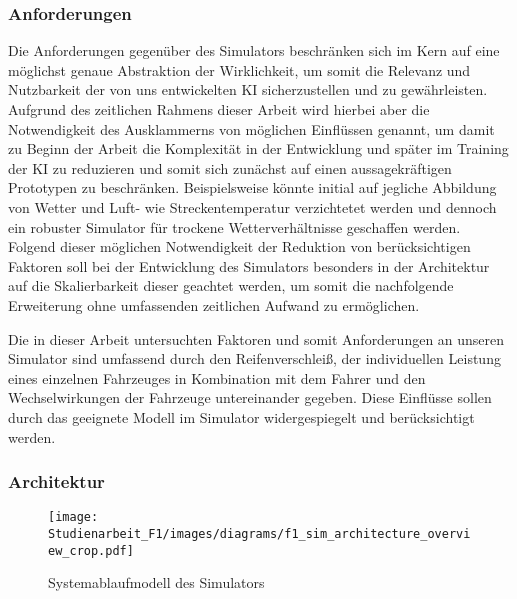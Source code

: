 \subsubsection{Anforderungen}
Die Anforderungen gegenüber des Simulators beschränken sich im Kern auf eine möglichst genaue Abstraktion der Wirklichkeit, um somit die Relevanz und Nutzbarkeit der von uns entwickelten KI sicherzustellen und zu gewährleisten. Aufgrund des zeitlichen Rahmens dieser Arbeit wird hierbei aber die Notwendigkeit des Ausklammerns von möglichen Einflüssen genannt, um damit zu Beginn der Arbeit die Komplexität in der Entwicklung und später im Training der KI zu reduzieren und somit sich zunächst auf einen aussagekräftigen Prototypen zu beschränken. Beispielsweise könnte initial auf jegliche Abbildung von Wetter und Luft- wie Streckentemperatur verzichtetet werden und dennoch ein robuster Simulator für trockene Wetterverhältnisse geschaffen werden. Folgend dieser möglichen Notwendigkeit der Reduktion von berücksichtigen Faktoren soll bei der Entwicklung des Simulators besonders in der Architektur auf die Skalierbarkeit dieser geachtet werden, um somit die nachfolgende Erweiterung ohne umfassenden zeitlichen Aufwand zu ermöglichen.

Die in dieser Arbeit untersuchten Faktoren und somit Anforderungen an unseren Simulator sind umfassend durch den Reifenverschleiß, der individuellen Leistung eines einzelnen Fahrzeuges in Kombination mit dem Fahrer und den Wechselwirkungen der Fahrzeuge untereinander gegeben. Diese Einflüsse sollen durch das geeignete Modell im Simulator widergespiegelt und berücksichtigt werden.

\newpage %
\subsubsection{Architektur} \label{sim_architecture_header}
\begin{figure}[H]
    \centering
    \texttt{[image: Studienarbeit\_F1/images/diagrams/f1\_sim\_architecture\_overview\_crop.pdf]}
    \caption{Systemablaufmodell des Simulators}
    \label{fig:sim_architecture}
\end{figure}

